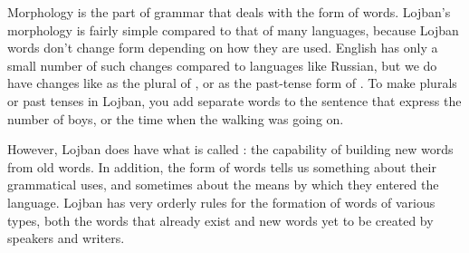 Morphology is the part of grammar that deals with the form of words. Lojban's morphology is fairly simple compared to that of many languages, because Lojban words don't change form depending on how they are used. English has only a small number of such changes compared to languages like Russian, but we do have changes like  as the plural of , or  as the past-tense form of . To make plurals or past tenses in Lojban, you add separate words to the sentence that express the number of boys, or the time when the walking was going on.

However, Lojban does have what is called : the capability of building new words from old words. In addition, the form of words tells us something about their grammatical uses, and sometimes about the means by which they entered the language. Lojban has very orderly rules for the formation of words of various types, both the words that already exist and new words yet to be created by speakers and writers.

